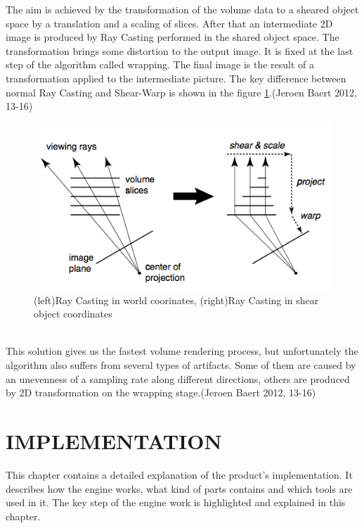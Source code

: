 \documentclass[twoside, english, 11pt]{report}
\begin{document}
The aim is achieved by the transformation of the volume data to a sheared object space by a translation and a scaling of slices. After that an intermediate 2D image is produced by Ray Casting performed in the shared object space. The transformation brings some distortion to the output image. It is fixed at the last step of the algorithm called wrapping. The final image is the result of a transformation applied to the intermediate picture. The key difference between normal Ray Casting and Shear-Warp is shown in the figure \ref{fig:sw}.(Jeroen Baert 2012, 13-16)\\
\begin{figure}[!h]
\centerline{\includegraphics[scale=0.5]{img/shear-warp}}
\caption{(left)Ray Casting in world coorinates, (right)Ray Casting in shear object coordinates\label{fig:sw}}
\end{figure}
\\
This solution gives us the fastest volume rendering process, but unfortunately the algorithm also suffers from several types of artifacts. Some of them are caused by an unevenness of a sampling rate along different directions, others are produced by 2D transformation on the wrapping stage.(Jeroen Baert 2012, 13-16)\\

\chapter{IMPLEMENTATION}
This chapter contains a detailed explanation of the product's implementation. It describes how the engine works, what kind of parts contains and which tools are used in it. The key step of the engine work is highlighted and explained in this chapter.\\
\end{document}
